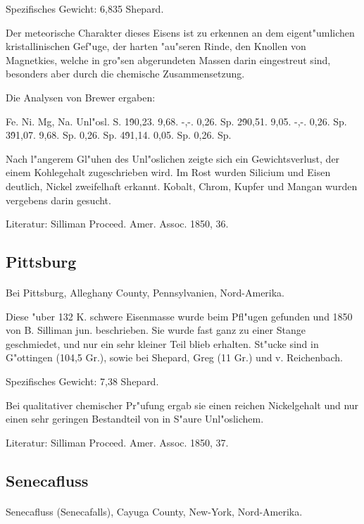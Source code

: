 \documentclass[a4paper, 11pt, oneside]{article}
\begin{document}
Spezifisches Gewicht: 6,835 Shepard.

Der meteorische Charakter dieses Eisens ist zu erkennen an dem eigent"umlichen kristallinischen Gef"uge, der harten "au"seren Rinde, den Knollen von Magnetkies, welche in gro"sen abgerundeten Massen darin eingestreut sind, besonders aber durch die chemische Zusammensetzung.

Die Analysen von Brewer ergaben:

Fe. Ni. Mg, Na. Unl"osl. S.  
1\. 90,23. 9,68. -,-. 0,26. Sp.  
2\. 90,51. 9,05. -,-. 0,26. Sp.  
3\. 91,07. 9,68. Sp. 0,26. Sp.  
4\. 91,14. 0,05. Sp. 0,26. Sp.

Nach l"angerem Gl"uhen des Unl"oslichen zeigte sich ein Gewichtsverlust, der einem Kohlegehalt zugeschrieben wird. Im Rost wurden Silicium und Eisen deutlich, Nickel zweifelhaft erkannt. Kobalt, Chrom, Kupfer und Mangan wurden vergebens darin gesucht.

Literatur: Silliman Proceed. Amer. Assoc. 1850, 36.

\subsection{Pittsburg}
\normalsize
\paragraph{}
Bei Pittsburg, Alleghany County, Pennsylvanien, Nord-Amerika.

Diese "uber 132 K. schwere Eisenmasse wurde beim Pfl"ugen gefunden und 1850 von B. Silliman jun. beschrieben. Sie wurde fast ganz zu einer Stange geschmiedet, und nur ein sehr kleiner Teil blieb erhalten. St"ucke sind in G"ottingen (104,5 Gr.), sowie bei Shepard, Greg (11 Gr.) und v. Reichenbach.

Spezifisches Gewicht: 7,38 Shepard.

Bei qualitativer chemischer Pr"ufung ergab sie einen reichen Nickelgehalt und nur einen sehr geringen Bestandteil von in S"aure Unl"oslichem.

Literatur: Silliman Proceed. Amer. Assoc. 1850, 37.

\subsection{Senecafluss}
\normalsize
\paragraph{}
Senecafluss (Senecafalls), Cayuga County, New-York, Nord-Amerika.
\end{document}
